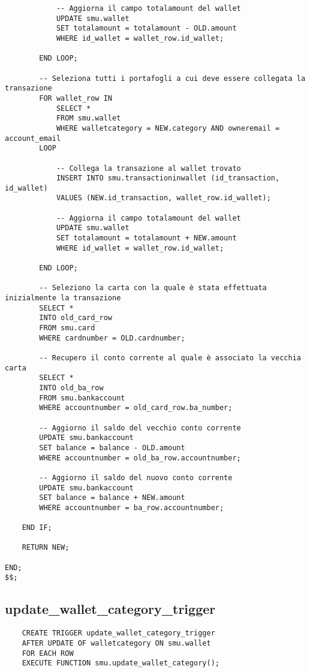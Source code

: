 \begin{lstlisting}
            -- Aggiorna il campo totalamount del wallet
            UPDATE smu.wallet
            SET totalamount = totalamount - OLD.amount
            WHERE id_wallet = wallet_row.id_wallet;

        END LOOP;

        -- Seleziona tutti i portafogli a cui deve essere collegata la transazione
        FOR wallet_row IN
            SELECT *
            FROM smu.wallet
            WHERE walletcategory = NEW.category AND owneremail = account_email
        LOOP

            -- Collega la transazione al wallet trovato
            INSERT INTO smu.transactioninwallet (id_transaction, id_wallet)
            VALUES (NEW.id_transaction, wallet_row.id_wallet);

            -- Aggiorna il campo totalamount del wallet
            UPDATE smu.wallet
            SET totalamount = totalamount + NEW.amount
            WHERE id_wallet = wallet_row.id_wallet;

        END LOOP;        

        -- Seleziono la carta con la quale è stata effettuata inizialmente la transazione
        SELECT *
        INTO old_card_row
        FROM smu.card
        WHERE cardnumber = OLD.cardnumber;

        -- Recupero il conto corrente al quale è associato la vecchia carta
        SELECT *
        INTO old_ba_row
        FROM smu.bankaccount
        WHERE accountnumber = old_card_row.ba_number;

        -- Aggiorno il saldo del vecchio conto corrente
        UPDATE smu.bankaccount
        SET balance = balance - OLD.amount
        WHERE accountnumber = old_ba_row.accountnumber;

        -- Aggiorno il saldo del nuovo conto corrente
        UPDATE smu.bankaccount
        SET balance = balance + NEW.amount
        WHERE accountnumber = ba_row.accountnumber;

    END IF;

    RETURN NEW;
	
END;
$$;
\end{lstlisting}

\newpage

\subsection{update\_wallet\_category\_trigger}

\begin{lstlisting}
    CREATE TRIGGER update_wallet_category_trigger 
    AFTER UPDATE OF walletcategory ON smu.wallet 
    FOR EACH ROW 
    EXECUTE FUNCTION smu.update_wallet_category();
\end{lstlisting}

